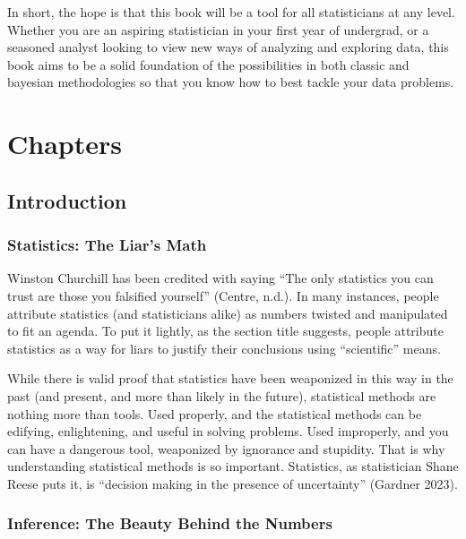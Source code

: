 \documentclass[
  letterpaper,
  DIV=11,
  numbers=noendperiod]{scrreprt}
\begin{document}
In short, the hope is that this book will be a tool for all
statisticians at any level. Whether you are an aspiring statistician in
your first year of undergrad, or a seasoned analyst looking to view new
ways of analyzing and exploring data, this book aims to be a solid
foundation of the possibilities in both classic and bayesian
methodologies so that you know how to best tackle your data problems.

\part{Chapters}

\hypertarget{introduction}{%
\chapter{Introduction}\label{introduction}}

\hypertarget{statistics-the-liars-math}{%
\section{Statistics: The Liar's Math}\label{statistics-the-liars-math}}

Winston Churchill has been credited with saying ``The only statistics
you can trust are those you falsified yourself'' (Centre, n.d.). In many
instances, people attribute statistics (and statisticians alike) as
numbers twisted and manipulated to fit an agenda. To put it lightly, as
the section title suggests, people attribute statistics as a way for
liars to justify their conclusions using ``scientific'' means.

While there is valid proof that statistics have been weaponized in this
way in the past (and present, and more than likely in the future),
statistical methods are nothing more than tools. Used properly, and the
statistical methods can be edifying, enlightening, and useful in solving
problems. Used improperly, and you can have a dangerous tool, weaponized
by ignorance and stupidity. That is why understanding statistical
methods is so important. Statistics, as statistician Shane Reese puts
it, is ``decision making in the presence of uncertainty'' (Gardner
2023).

\hypertarget{inference-the-beauty-behind-the-numbers}{%
\section{Inference: The Beauty Behind the
Numbers}\label{inference-the-beauty-behind-the-numbers}}
\end{document}
